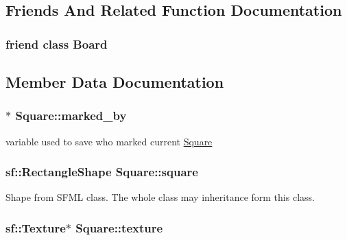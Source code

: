\subsection{Friends And Related Function Documentation}
\hypertarget{class_square_a12525b6ed7c8186be0bee5cf78e2a49c}{}
\subsubsection[{Board}]{\setlength{\rightskip}{0pt plus 5cm}friend class {\bf Board}\hspace{0.3cm}{\ttfamily [friend]}}\label{class_square_a12525b6ed7c8186be0bee5cf78e2a49c}


\subsection{Member Data Documentation}
\hypertarget{class_square_a1304492dc99a6af1f0bf2ab24d97520a}{}
\subsubsection[{marked\+\_\+by}]{$\ast$ Square\+::marked\+\_\+by\hspace{0.3cm}{\ttfamily [private]}}\label{class_square_a1304492dc99a6af1f0bf2ab24d97520a}


variable used to save who marked current \hyperlink{class_square}{Square} 

\hypertarget{class_square_a973d093bc18730c9ad2e74f9866af996}{}
\subsubsection[{square}]{\setlength{\rightskip}{0pt plus 5cm}sf\+::\+Rectangle\+Shape Square\+::square\hspace{0.3cm}{\ttfamily [private]}}\label{class_square_a973d093bc18730c9ad2e74f9866af996}


Shape from S\+F\+M\+L class. The whole class may inheritance form this class. 

\hypertarget{class_square_a9bd6a0eca56aa3075227f56ee54d7808}{}
\subsubsection[{texture}]{\setlength{\rightskip}{0pt plus 5cm}sf\+::\+Texture$\ast$ Square\+::texture\hspace{0.3cm}{\ttfamily [private]}}\label{class_square_a9bd6a0eca56aa3075227f56ee54d7808}


